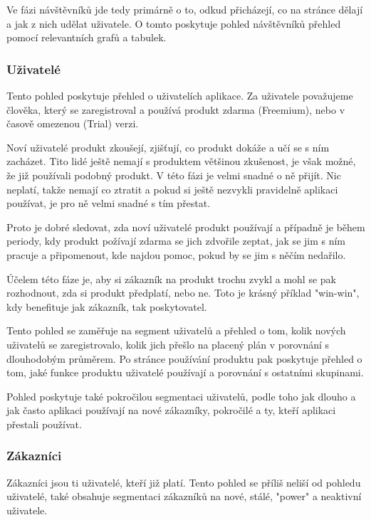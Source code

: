\documentclass[bc,male,java,dept456]{diploma}						%
\begin{document}
\bigskip

Ve fázi návštěvníků jde tedy primárně o to, odkud přicházejí, co na stránce dělají a jak z nich udělat uživatele. O tomto poskytuje pohled návštěvníků přehled pomocí relevantních grafů a tabulek.




\subsubsection{Uživatelé}

Tento pohled poskytuje přehled o uživatelích aplikace. Za uživatele považujeme člověka, který se zaregistroval a používá produkt zdarma (Freemium), nebo v časově omezenou (Trial) verzi.

Noví uživatelé produkt zkoušejí, zjišťují, co produkt dokáže a učí se s ním zacházet. Tito lidé ještě nemají s  produktem většinou zkušenost, je však možné, že již používali podobný produkt. V této fázi je velmi snadné o ně přijít. Nic neplatí, takže nemají co ztratit a pokud si ještě nezvykli pravidelně aplikaci používat, je pro ně velmi snadné s tím přestat. 

Proto je dobré sledovat, zda noví uživatelé produkt používají a případně je během periody, kdy produkt požívají zdarma se jich zdvořile zeptat, jak se jim s ním pracuje a připomenout, kde najdou pomoc, pokud by se jim s něčím nedařilo.

Účelem této fáze je, aby si zákazník na produkt trochu zvykl a mohl se pak rozhodnout, zda si produkt předplatí, nebo ne. Toto je krásný příklad "win-win", kdy benefituje jak zákazník, tak poskytovatel.

Tento pohled se zaměřuje na segment uživatelů a přehled o tom, kolik nových u\-ži\-va\-te\-lů se zaregistrovalo, kolik jich přešlo na placený plán v porovnání s dlouhodobým průměrem. Po stránce používání produktu pak poskytuje přehled o tom, jaké funkce produktu u\-ži\-va\-te\-lé používají a porovnání s ostatními skupinami.

Pohled poskytuje také pokročilou segmentaci uživatelů, podle toho jak dlouho a jak často aplikaci používají na nové zákazníky, pokročilé a ty, kteří aplikaci přestali používat.


\subsubsection{Zákazníci}

Zákazníci jsou ti uživatelé, kteří již platí. Tento pohled se příliš neliší od pohledu uživatelé, také obsahuje segmentaci zákazníků na nové, stálé, "power" a neaktivní uživatele.
\end{document}
